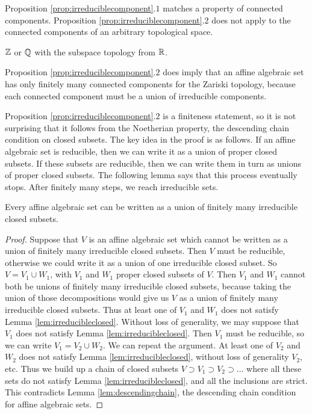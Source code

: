 Proposition \ref{prop:irreduciblecomponent}.$ 1 $ matches a property of connected components. Proposition \ref{prop:irreduciblecomponent}.$ 2 $ does not apply to the connected components of an arbitrary topological space.

\begin{example*}
$ \mathbb{Z} $ or $ \mathbb{Q} $ with the subspace topology from $ \mathbb{R} $.
\end{example*}

\begin{note*}
Proposition \ref{prop:irreduciblecomponent}.$ 2 $ does imply that an affine algebraic set has only finitely many connected components for the Zariski topology, because each connected component must be a union of irreducible components.
\end{note*}

Proposition \ref{prop:irreduciblecomponent}.$ 2 $ is a finiteness statement, so it is not surprising that it follows from the Noetherian property, the descending chain condition on closed subsets. The key idea in the proof is as follows. If an affine algebraic set is reducible, then we can write it as a union of proper closed subsets. If these subsets are reducible, then we can write them in turn as unions of proper closed subsets. The following lemma says that this process eventually stops. After finitely many steps, we reach irreducible sets.

\begin{lemma}
\label{lem:irreducibleclosed}
Every affine algebraic set can be written as a union of finitely many irreducible closed subsets.
\end{lemma}

\begin{proof}
Suppose that $ V $ is an affine algebraic set which cannot be written as a union of finitely many irreducible closed subsets. Then $ V $ must be reducible, otherwise we could write it as a union of one irreducible closed subset. So $ V = V_1 \cup W_1 $, with $ V_1 $ and $ W_1 $ proper closed subsets of $ V $. Then $ V_1 $ and $ W_1 $ cannot both be unions of finitely many irreducible closed subsets, because taking the union of those decompositions would give us $ V $ as a union of finitely many irreducible closed subsets. Thus at least one of $ V_1 $ and $ W_1 $ does not satisfy Lemma \ref{lem:irreducibleclosed}. Without loss of generality, we may suppose that $ V_1 $ does not satisfy Lemma \ref{lem:irreducibleclosed}. Then $ V_1 $ must be reducible, so we can write $ V_1 = V_2 \cup W_2 $. We can repeat the argument. At least one of $ V_2 $ and $ W_2 $ does not satisfy Lemma \ref{lem:irreducibleclosed}, without loss of generality $ V_2 $, etc. Thus we build up a chain of closed subsets $ V \supset V_1 \supset V_2 \supset \dots $ where all these sets do not satisfy Lemma \ref{lem:irreducibleclosed}, and all the inclusions are strict. This contradicts Lemma \ref{lem:descendingchain}, the descending chain condition for affine algebraic sets.
\end{proof}

